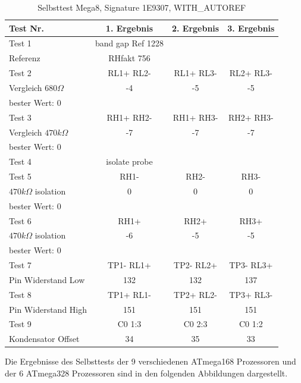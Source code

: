 \begin{table}[H]
  \begin{center}
    \begin{tabular}{| l | c | c | c |}
    \hline
Test Nr. & 1. Ergebnis & 2. Ergebnis & 3. Ergebnis \\
    \hline
    \hline
Test 1 & band gap Ref  1228 &  & \\
Referenz  & RHfakt 756 &  &  \\
    \hline
Test 2 & RL1+ RL2- & RL1+ RL3- & RL2+ RL3- \\
Vergleich \(680\Omega\) & -4 & -5 & -5 \\
bester Wert: 0 & & & \\
    \hline
Test 3 & RH1+ RH2- & RH1+ RH3- & RH2+ RH3- \\
Vergleich \(470k\Omega\) & -7 & -7 & -7 \\
bester Wert: 0 & & & \\
    \hline
Test 4 & isolate probe & & \\
    \hline
Test 5 & RH1- &  RH2- & RH3- \\
\(470k\Omega\) isolation & 0 & 0 & 0 \\
bester Wert: 0 & & & \\
    \hline
Test 6 & RH1+ & RH2+ & RH3+ \\
\(470k\Omega\) isolation & -6 & -5 & -5 \\
bester Wert: 0 & & & \\
    \hline
Test 7 & TP1- RL1+ & TP2- RL2+ & TP3- RL3+ \\
Pin Widerstand Low & 132 & 132 & 137 \\
    \hline
Test 8 & TP1+ RL1- & TP2+ RL2- & TP3+ RL3- \\
Pin Widerstand High & 151 & 151 & 151 \\
    \hline
Test 9 & C0  1:3 & C0  2:3 & C0 1:2 \\
Kondensator Offset & 34 & 35 & 33 \\
    \hline
    \end{tabular}
  \end{center}
  \caption{Selbsttest Mega8, Signature 1E9307, WITH\_AUTOREF}
  \label{tab:test_m8} 
\end{table}

Die Ergebnisse des Selbsttests der 9 verschiedenen ATmega168 Prozessoren und der 6 ATmega328 Prozessoren
sind in den folgenden Abbildungen dargestellt. 

